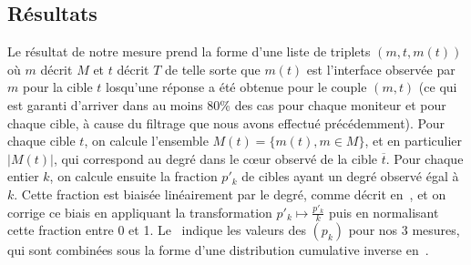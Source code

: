 \subsection{Résultats}
\label{subsec:udpping-measurement-results}

Le résultat de notre mesure prend la forme d'une liste de triplets $(m, t,
m(t))$ où $m$ décrit $M$ et $t$ décrit $T$ de telle sorte que $m(t)$ est
l'interface observée par $m$ pour la cible $t$ losqu'une réponse a été obtenue
pour le couple $(m, t)$ (ce qui est garanti d'arriver dans au moins 80\% des
cas pour chaque moniteur et pour chaque cible, à cause du filtrage que nous
avons effectué précédemment). Pour chaque cible $t$, on calcule l'ensemble
$M(t) = \{ m(t), m \in M \}$, et en particulier $|M(t)|$, qui correspond au
degré dans le c\oe{}ur observé de la cible $\overline{t}$. Pour chaque entier $k$,
on calcule ensuite la fraction $p'_k$ de cibles ayant un degré observé égal à
$k$. Cette fraction est biaisée linéairement par le degré, comme décrit
en~, et on corrige ce biais en appliquant la
transformation $p'_k \mapsto \frac{p'_k}{k}$ puis en normalisant cette fraction
entre 0 et 1. Le~ indique les
valeurs des $(p_k)$ pour nos 3 mesures, qui sont combinées sous la forme d'une distribution
cumulative inverse en~.



